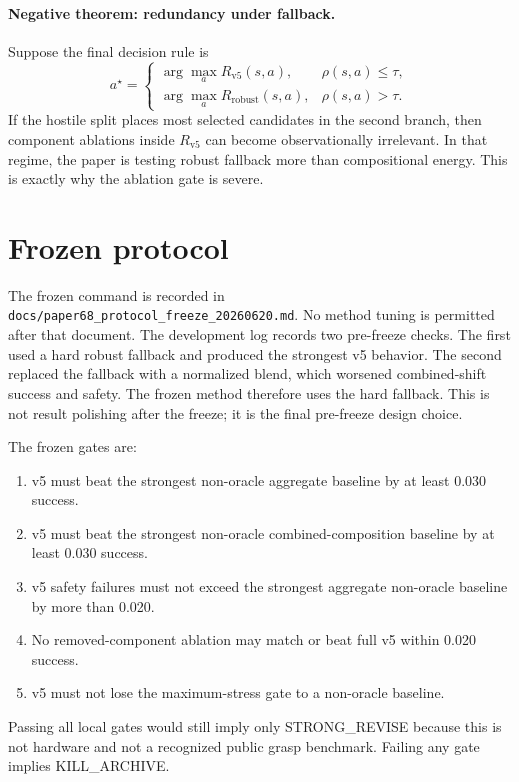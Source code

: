 \documentclass{article}
\begin{document}
\paragraph{Negative theorem: redundancy under fallback.}
Suppose the final decision rule is
\[
  a^\star =
  \begin{cases}
  \arg\max_a R_{\text{v5}}(s,a), & \rho(s,a) \le \tau,\\
  \arg\max_a R_{\text{robust}}(s,a), & \rho(s,a) > \tau.
  \end{cases}
\]
If the hostile split places most selected candidates in the second branch, then component ablations inside $R_{\text{v5}}$ can become observationally irrelevant.
In that regime, the paper is testing robust fallback more than compositional energy.
This is exactly why the ablation gate is severe.

\section{Frozen protocol}

The frozen command is recorded in \texttt{docs/paper68\_protocol\_freeze\_20260620.md}.
No method tuning is permitted after that document.
The development log records two pre-freeze checks.
The first used a hard robust fallback and produced the strongest v5 behavior.
The second replaced the fallback with a normalized blend, which worsened combined-shift success and safety.
The frozen method therefore uses the hard fallback.
This is not result polishing after the freeze; it is the final pre-freeze design choice.

The frozen gates are:

\begin{enumerate}
\item v5 must beat the strongest non-oracle aggregate baseline by at least 0.030 success.
\item v5 must beat the strongest non-oracle combined-composition baseline by at least 0.030 success.
\item v5 safety failures must not exceed the strongest aggregate non-oracle baseline by more than 0.020.
\item No removed-component ablation may match or beat full v5 within 0.020 success.
\item v5 must not lose the maximum-stress gate to a non-oracle baseline.
\end{enumerate}

Passing all local gates would still imply only STRONG\_REVISE because this is not hardware and not a recognized public grasp benchmark.
Failing any gate implies KILL\_ARCHIVE.
\end{document}

